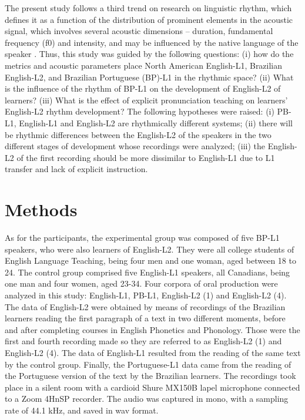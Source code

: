 
The present study follows a third trend on research on linguistic rhythm, which
defines it as a function of the distribution of prominent elements in the
acoustic signal, which involves several acoustic dimensions – duration,
fundamental frequency (f0) and intensity, and may be influenced by the native
language of the speaker \citep{cumming2010,fuchs2016,silva2020}.
Thus, this study was guided by the following questions: (i) how do the metrics
and acoustic parameters place North American English-L1, Brazilian English-L2,
and Brazilian Portuguese (BP)-L1 in the rhythmic space? (ii) What is the
influence of the rhythm of BP-L1 on the development of English-L2 of learners?
(iii) What is the effect of explicit pronunciation teaching on learners'
English-L2 rhythm development? The following hypotheses were raised: (i) PB-L1,
English-L1 and English-L2 are rhythmically different systems; (ii) there will
be rhythmic differences between the English-L2 of the speakers in the two
different stages of development whose recordings were analyzed; (iii) the
English-L2 of the first recording should be more dissimilar to English-L1 due
to L1 transfer and lack of explicit instruction. 

\section{Methods}
As for the participants, the experimental group was composed of five BP-L1
speakers, who were also learners of English-L2. They were all college students
of English Language Teaching, being four men and one woman, aged between 18 to
24. The control group comprised five English-L1 speakers, all Canadians, being
one man and four women, aged 23-34. Four corpora of oral production were
analyzed in this study: English-L1, PB-L1, English-L2 (1) and English-L2 (4).
The data of English-L2 were obtained by means of recordings of the Brazilian
learners reading the first paragraph of a text in two different moments, before
and after completing courses in English Phonetics and Phonology. Those were the
first and fourth recording made so they are referred to as English-L2 (1) and
English-L2 (4). The data of English-L1 resulted from the reading of the same
text by the control group. Finally, the Portuguese-L1 data came from the
reading of the Portuguese version of the text by the Brazilian learners. The
recordings took place in a silent room with a cardioid Shure MX150B lapel
microphone connected to a Zoom 4HnSP recorder. The audio was captured in mono,
with a sampling rate of 44.1 kHz, and saved in wav format.


